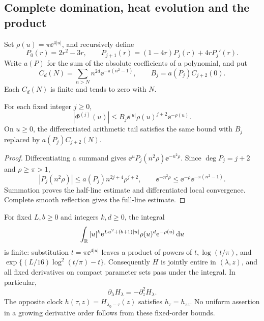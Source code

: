 \subsection{Complete domination, heat evolution and the product}

Set \(\rho(u)=\pi\ee^{4|u|}\), and recursively define
\[
 P_0(r)=2r^2-3r,\qquad
 P_{j+1}(r)=(1-4r)P_j(r)+4rP_j'(r).
\]
Write \(a(P)\) for the sum of the absolute coefficients of a polynomial,
and put
\[
 C_d(N)=\sum_{n>N}n^{2d}\ee^{-\pi(n^2-1)},\qquad
 B_j=a(P_j)C_{j+2}(0).
\]
Each \(C_d(N)\) is finite and tends to zero with \(N\).

\begin{lemma}\label{lem:source}
For each fixed integer \(j\ge0\),
\[
 |\Phi^{(j)}(u)|\le B_j\ee^{|u|}\rho(u)^{j+2}\ee^{-\rho(u)}.
\]
On \(u\ge0\), the differentiated arithmetic tail satisfies the same
bound with \(B_j\) replaced by \(a(P_j)C_{j+2}(N)\).
\end{lemma}
\begin{proof}
Differentiating a summand gives
\(\ee^uP_j(n^2\rho)\ee^{-n^2\rho}\).
Since \(\deg P_j=j+2\) and \(\rho\ge\pi>1\),
\[
 |P_j(n^2\rho)|\le a(P_j)n^{2j+4}\rho^{j+2},\qquad
 \ee^{-n^2\rho}\le\ee^{-\rho}\ee^{-\pi(n^2-1)}.
\]
Summation proves the half-line estimate and differentiated local
convergence. Complete smooth reflection gives the full-line estimate.
\end{proof}

For fixed \(L,b\ge0\) and integers \(k,d\ge0\), the integral
\[
 \int_\mathbb R |u|^k\mathrm e^{Lu^2+(b+1)|u|}
             \rho(u)^d\mathrm e^{-\rho(u)}\,\mathrm d u
\]
is finite: substitution \(t=\pi\ee^{4|u|}\) leaves a product of
powers of \(t,\log(t/\pi)\), and
\(\exp\{(L/16)\log^2(t/\pi)-t\}\).
Consequently \(H\) is jointly entire in \((\lambda,z)\), and all
fixed derivatives on compact parameter sets pass under the integral.
In particular,
\begin{equation}\label{eq:heat}
 \partial_\lambda H_\lambda=-\partial_z^2H_\lambda.
\end{equation}
The opposite clock \(h(\tau,z)=H_{\lambda_0-\tau}(z)\) satisfies
\(h_\tau=h_{zz}\). No uniform assertion in a growing derivative
order follows from these fixed-order bounds.


